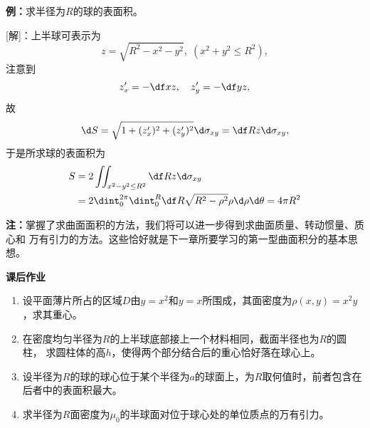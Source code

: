 {\bf 例：}求半径为$R$的球的表面积。

[解]：上半球可表示为
$$z=\sqrt{R^2-x^2-y^2},\;(x^2+y^2\leq R^2),$$
注意到
$$z'_x=-\df xz,\quad z'_y=-\df yz,$$
故
$$\d S=\sqrt{1+(z'_x)^2+(z'_y)^2}\d\sigma_{xy}=\df Rz\d\sigma_{xy},$$
于是所求球的表面积为
\begin{align*}
	S&=2\iint_{x^2-y^2\leq R^2}\df Rz\d\sigma_{xy}\\
	&=2\dint_0^{2\pi}\dint_0^R\df R{\sqrt{R^2-\rho^2}}\rho\d\rho\d\theta
	=4\pi R^2
\end{align*}

{\bf 注：}掌握了求曲面面积的方法，我们将可以进一步得到求曲面质量、转动惯量、质心和
万有引力的方法。这些恰好就是下一章所要学习的第一型曲面积分的基本思想。

\begin{ext}
	{\bf 课后作业}
	\begin{enumerate}
	  \item 设平面薄片所占的区域$D$由$y=x^2$和$y=x$所围成，其面密度为$\rho(x,y)
	  =x^2y$，求其重心。
	  \item 在密度均匀半径为$R$的上半球底部接上一个材料相同，截面半径也为$R$的圆柱，
	  求圆柱体的高$h$，使得两个部分结合后的重心恰好落在球心上。
	  \item 设半径为$R$的球的球心位于某个半径为$a$的球面上，为$R$取何值时，前者包含在
	  后者中的表面积最大。
	  \item 求半径为$R$面密度为$\mu_0$的半球面对位于球心处的单位质点的万有引力。
	\end{enumerate}
\end{ext}

